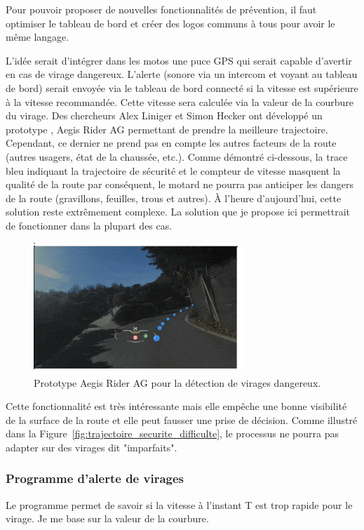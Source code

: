 Pour pouvoir proposer de nouvelles fonctionnalités de prévention, il faut optimiser le tableau de bord et créer des logos communs à tous pour avoir le même langage. 

L'idée serait d'intégrer dans les motos une puce GPS qui serait capable d'avertir en cas de virage dangereux. L'alerte (sonore via un intercom et voyant au tableau de bord) serait envoyée via le tableau de bord connecté si la vitesse est supérieure à la vitesse recommandée. Cette vitesse sera calculée via la valeur de la courbure du virage. Des chercheurs Alex Liniger et Simon Hecker ont développé un prototype , Aegis Rider AG\cite{vitesse_virage_mcnews} permettant de prendre la meilleure trajectoire. Cependant, ce dernier ne prend pas en compte les autres facteurs de la route (autres usagers, état de la chaussée, etc.). Comme démontré ci-dessous, la trace bleu indiquant la trajectoire de sécurité et le compteur de vitesse masquent la qualité de la route par conséquent, le motard ne pourra pas anticiper les dangers de la route (gravillons, feuilles, trous et autres). À l'heure d'aujourd'hui, cette solution reste extrêmement complexe. La solution que je propose ici permettrait de fonctionner dans la plupart des cas.

\begin{figure}[H]
    \centering
    \includegraphics[width=0.7\textwidth]{coeur_memoire/images/aegis.png} 
    \caption{Prototype Aegis Rider AG pour la détection de virages dangereux.}
\end{figure}
Cette fonctionnalité est très intéressante mais elle empêche une bonne visibilité de la surface de la route et elle peut fausser une prise de décision.
Comme illustré dans la Figure~\ref{fig:trajectoire_securite_difficulte}, le processus ne pourra pas adapter sur des virages dit "imparfaits".

\subsubsection{Programme d'alerte de virages}
Le programme permet de savoir si la vitesse à l'instant T est trop rapide pour le virage. Je me base sur la valeur de la courbure.

